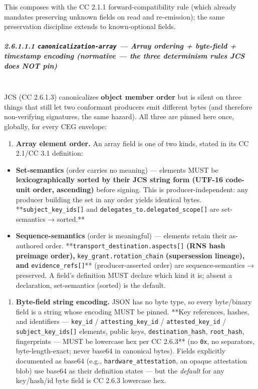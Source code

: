 \documentclass[11pt]{article}
\begin{document}
This composes with the CC 2.1.1 forward-compatibility rule (which already mandates preserving unknown fields on read and re-emission); the same preservation discipline extends to known-optional fields.


\subparagraph{2.6.1.1.1 \texttt{canonicalization-array} — Array ordering + byte-field + timestamp encoding (normative — the three determinism rules JCS does NOT pin)}\mbox{}\\


JCS (CC 2.6.1.3) canonicalizes \textbf{object member order} but is silent on three things that still let two conformant producers emit different bytes (and therefore non-verifying signatures, the same hazard). All three are pinned here once, globally, for every CEG envelope:


\begin{enumerate}\setlength\itemsep{0pt}
\item \textbf{Array element order.} An array field is one of two kinds, stated in its CC 2.1/CC 3.1 definition:
\end{enumerate}

\begin{itemize}\setlength\itemsep{0pt}
\item \textbf{Set-semantics} (order carries no meaning) — elements MUST be \textbf{lexicographically sorted by their JCS string form (UTF-16 code-unit order, ascending)} before signing. This is producer-independent: any producer building the set in any order yields identical bytes. **\texttt{subject\_key\_ids[]} and \texttt{delegates\_to.delegated\_scope[]} are set-semantics → sorted.**
\item \textbf{Sequence-semantics} (order is meaningful) — elements retain their as-authored order. **\texttt{transport\_destination.aspects[]}\textbf{ (RNS hash preimage order), }\texttt{key\_grant.rotation\_chain}\textbf{ (supersession lineage), and }\texttt{evidence\_refs[]}** (producer-asserted order) are sequence-semantics → preserved. A field's definition MUST declare which kind it is; absent a declaration, set-semantics (sorted) is the default.
\end{itemize}

\begin{enumerate}\setlength\itemsep{0pt}
\item \textbf{Byte-field string encoding.} JSON has no byte type, so every byte/binary field is a string whose encoding MUST be pinned. **Key references, hashes, and identifiers — \texttt{key\_id} / \texttt{attesting\_key\_id} / \texttt{attested\_key\_id} / \texttt{subject\_key\_ids[]} elements, public keys, \texttt{destination\_hash}, \texttt{root\_hash}, fingerprints — MUST be lowercase hex per CC 2.6.3** (no \texttt{0x}, no separators, byte-length-exact; never base64 in canonical bytes). Fields explicitly documented as base64 (e.g., \texttt{hardware\_attestation}, an opaque attestation blob) use base64 as their definition states — but the \textit{default} for any key/hash/id byte field is CC 2.6.3 lowercase hex.
\end{enumerate}
\end{document}
